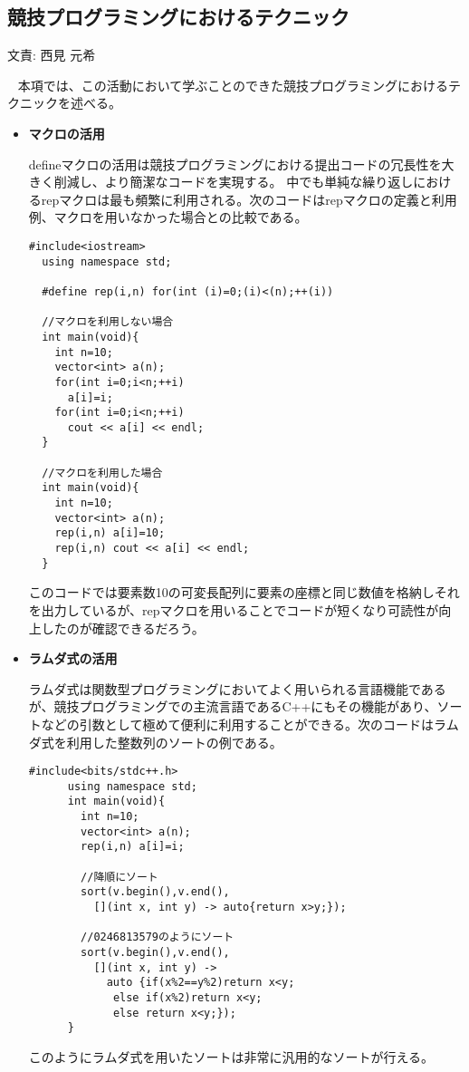 \documentclass[11pt,a4paper]{jsarticle}
\newcommand{\writtenBy}[1]{\begin{flushright}文責: #1\end{flushright}~}
\begin{document}
\subsection{競技プログラミングにおけるテクニック}
\writtenBy{西見 元希}
%
本項では、この活動において学ぶことのできた競技プログラミングにおけるテクニックを述べる。
%
\begin{itemize}
    \item{\bf マクロの活用}
      \par
      defineマクロの活用は競技プログラミングにおける提出コードの冗長性を大きく削減し、より簡潔なコードを実現する。
      中でも単純な繰り返しにおけるrepマクロは最も頻繁に利用される。次のコードはrepマクロの定義と利用例、マクロを用いなかった場合との比較である。

  
%
  \begin{lstlisting}[caption=repマクロの例,label=fuga]
  #include<iostream>
  using namespace std;
 
  #define rep(i,n) for(int (i)=0;(i)<(n);++(i))
  
  //マクロを利用しない場合
  int main(void){
    int n=10;
    vector<int> a(n);
    for(int i=0;i<n;++i)
      a[i]=i;
    for(int i=0;i<n;++i)
      cout << a[i] << endl;
  }

  //マクロを利用した場合
  int main(void){
    int n=10;
    vector<int> a(n);
    rep(i,n) a[i]=10;
    rep(i,n) cout << a[i] << endl;
  }
  \end{lstlisting}
  このコードでは要素数10の可変長配列に要素の座標と同じ数値を格納しそれを出力しているが、repマクロを用いることでコードが短くなり可読性が向上したのが確認できるだろう。
      \par
    \item{\bf ラムダ式の活用}
      \par
      ラムダ式は関数型プログラミングにおいてよく用いられる言語機能であるが、競技プログラミングでの主流言語であるC++にもその機能があり、ソートなどの引数として極めて便利に利用することができる。次のコードはラムダ式を利用した整数列のソートの例である。
      \begin{lstlisting}[caption=lambda式の例]
      #include<bits/stdc++.h>
      using namespace std;
      int main(void){
        int n=10;
        vector<int> a(n);
        rep(i,n) a[i]=i;

        //降順にソート
        sort(v.begin(),v.end(),
          [](int x, int y) -> auto{return x>y;});

        //0246813579のようにソート
        sort(v.begin(),v.end(),
          [](int x, int y) ->
            auto {if(x%2==y%2)return x<y;
             else if(x%2)return x<y;
             else return x<y;});
      }
      \end{lstlisting}
      このようにラムダ式を用いたソートは非常に汎用的なソートが行える。
      \par

\end{itemize}
\end{document}
